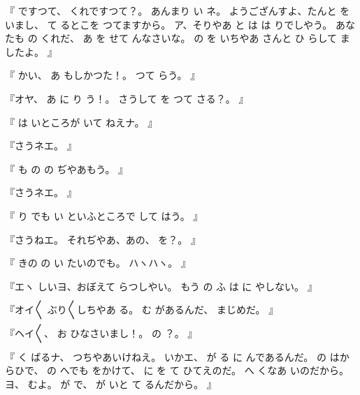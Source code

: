 『
ですつて、
くれですつて？。
あんまり
い
ネ。
ようござんすよ、たんと
を
いまし、
て
るとこを
つてますから。
ア、そりやあ
と
は
は
りでしやう。
あなたも
の
くれだ、
あ
を
せて
んなさいな。
の
を
いちやあ
さんと
ひ
らして
ましたよ。
』

『
かい、
あ
もしかつた！。
つて
らう。
』

『オヤ、
あ
に
り
う！。
さうして
を
つて
さる？。
』

『
は
いところが
いて
ねえナ。
』

『さうネエ。
』

『
も
の
の
ぢやあもう。
』

『さうネエ。
』

『
り
でも
い
といふところで
して
はう。
』

『さうねエ。
それぢやあ、あの、
を？。
』

『
きの
の
い
たいのでも。
ハヽハヽ。
』

『エヽ
しいヨ、おぼえて
らつしやい。
もう
の
ふ
は
に
やしない。
』

『オイ〳〵
ぶり〳〵しちやあ
る。
む
があるんだ、
まじめだ。
』

『ヘイ〳〵、
お
ひなさいまし！。
の
？。
』

『
く
ばるナ、
つちやあいけねえ。
いかエ、
が
る
に
んであるんだ。
の
はからひで、
の
へでも
をかけて、
に
を
て
ひてえのだ。
へ
くなあ
いのだから。
ヨ、
むよ。
が
で、
が
いと
て
るんだから。
』

